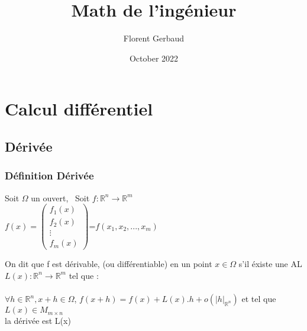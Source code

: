 \documentclass[11pt]{article}
\title{Math de l'ingénieur}
\author{Florent Gerbaud}
\date{October 2022}
\begin{document}
    \maketitle
    \tableofcontents
    \section{Calcul différentiel}
        \subsection{Dérivée}
            \subsubsection{Définition Dérivée}
                \begin{center}
                    Soit $\Omega$ un ouvert, \ 
                    Soit $f: \mathbb{R}^n \longrightarrow \mathbb{R}^m $ \\
                    $f(x)=\begin{pmatrix}
                     f_1(x)\\
                     f_2(x)\\
                    \vdots\\
                     f_m(x)
                    \end{pmatrix}$=$f(x_1,x_2,...,x_m)$
                \end{center}
               
                On dit que f est dérivable, (ou différentiable) en un point $x\in \Omega$ s'il éxiste une AL $L(x):\mathbb{R}^n \longrightarrow \mathbb{R}^m$ tel que : \\ \\
                $\forall h \in \mathbb{R}^n, x+h \in \Omega$, 
                $f(x+h)=f(x)+L(x).h+o(|h|_{\mathbb{R}^n})$ et tel que $L(x) \in M_{m \times n}$
                \\ la dérivée est L(x)
                    
        \section{}
        
 
\end{document}
